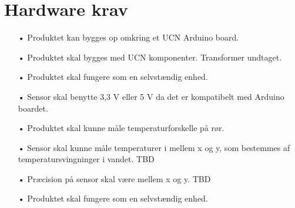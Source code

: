 \section{Hardware krav}
\begin{enumerate}
	\item[•]Produktet kan bygges op omkring et UCN Arduino board. 
	\item[•]Produktet skal bygges med UCN komponenter. Transformer undtaget.
	\item[•]Produktet skal fungere som en selvstændig enhed.
	\item[•]Sensor skal benytte 3,3 V eller 5 V da det er kompatibelt med Arduino boardet.
	\item[•]Produktet skal kunne måle temperaturforskelle på rør.
	\item[•]Sensor skal kunne måle temperaturer i mellem x og y, som bestemmes af temperatursvingninger i vandet. TBD
	\item[•]Præcision på sensor skal være mellem x og y. TBD
	\item[•]Produktet skal fungere som en selvstændig enhed.
\end{enumerate}	
